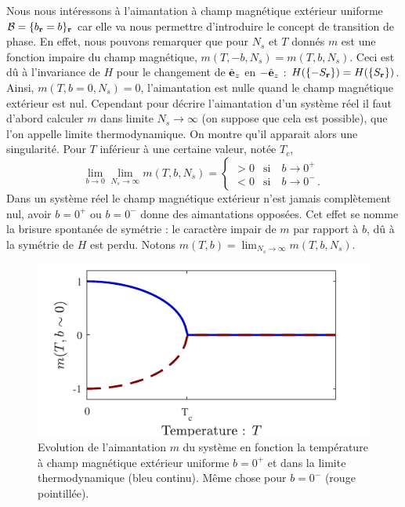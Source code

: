 \documentclass[10.5pt]{article}
\begin{document}
\begin{multicols*}{2}
Nous nous intéressons à l'aimantation à champ magnétique extérieur uniforme $\mathcal{B} = \{b_{\bf r} = b\}_{\bf r}$ car elle va nous permettre d'introduire le concept de transition de phase. En effet, nous pouvons remarquer que pour $N_s$ et $T$ donnés $m$ est une fonction impaire du champ magnétique, $m(T, -b, N_s) = m(T, b, N_s)$. Ceci est dû à l'invariance de $H$ pour le changement de $\hat{\mathbf{e}}_z$ en $-\hat{\mathbf{e}}_z$ : $H(\{-S_{\bf r}\}) = H(\{S_{\bf r}\})$. Ainsi, $m(T, b=0, N_s) = 0$, l'aimantation est nulle quand le champ magnétique extérieur est nul. Cependant pour décrire l'aimantation d'un système réel il faut d'abord calculer $m$ dans limite $N_s \to \infty$ (on suppose que cela est possible), que l'on appelle limite thermodynamique. On montre qu'il apparait alors une singularité. Pour $T$ inférieur à une certaine valeur, notée $T_c$, 
\begin{equation}
	\lim_{b\to 0} \lim_{N_s\to \infty} m(T,b,N_s) =
	\begin{cases}
			> 0 & \text{si} \quad b \to 0^+ \\
			< 0 & \text{si} \quad b  \to 0^- \, .
	\end{cases}
\end{equation}
Dans un système réel le champ magnétique extérieur n'est jamais complètement nul, avoir $b = 0^+$ ou $b=0^-$ donne des aimantations opposées. Cet effet se nomme la brisure spontanée de symétrie : le caractère impair de $m$ par rapport à $b$, dû à la symétrie de $H$ est perdu. Notons $m(T, b)= \lim_{N_s \to \infty} m(T,b,N_s)$.
\begin{figure}[H]
\begin{center}
\includegraphics[width=0.95\columnwidth]{aimantation.pdf}
\caption{Evolution de l'aimantation $m$ du système en fonction la température à champ magnétique extérieur uniforme $b = 0^+$ et dans la limite thermodynamique (bleu continu). Même chose pour $b = 0^-$ (rouge pointillée).}
\label{fig:aimantation}
\end{center}

\end{figure}
\end{multicols*}
\end{document}
